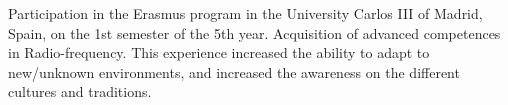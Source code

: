 \documentclass[helvetica,openbib,totpages]{europecv}
\begin{document}
\begin{europecv}
{Participation in the Erasmus program in the University Carlos III of Madrid, Spain, on the 1st semester of the 5th year. \newline
Acquisition of advanced competences in Radio-frequency. \newline
This experience increased the ability to adapt to new/unknown environments, and increased the awareness on the different cultures and traditions.
}

\end{europecv}
\end{document}

